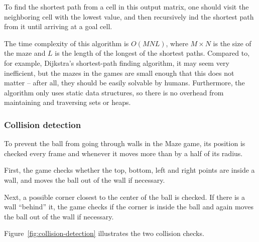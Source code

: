 \documentclass[a4paper,11pt]{article}
\begin{document}
To find the shortest path from a cell in this output matrix, one should visit
the neighboring cell with the lowest value, and then recursively ind the
shortest path from it until arriving at a goal cell.

The time complexity of this algorithm is $O(MNL)$, where $M \times N$ is the
size of the maze and $L$ is the length of the longest of the shortest paths.
Compared to, for example, Dijkstra's shortest-path finding algorithm, it may
seem very inefficient, but the mazes in the games are small enough that this
does not matter – after all, they should be easily solvable by humans.
Furthermore, the algorithm only uses static data structures, so there is
no overhead from maintaining and traversing sets or heaps.

\subsubsection{Collision detection}

To prevent the ball from going through walls in the Maze game, its position
is checked every frame and whenever it moves more than by a half of its radius.

First, the game checks whether the top, bottom, left and right points are
inside a wall, and moves the ball out of the wall if necessary.

Next, a possible corner closest to the center of the ball is checked.
If there is a wall “behind” it, the game checks if the corner is inside the ball
and again moves the ball out of the wall if necessary.

Figure~\ref{fig:collision-detection} illustrates the two collision checks.
\end{document}
